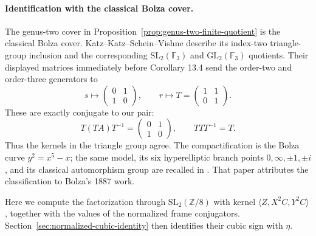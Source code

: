 \paragraph{Identification with the classical Bolza cover.}
The genus-two cover in Proposition~\ref{prop:genus-two-finite-quotient}
is the classical Bolza cover.  Katz--Katz--Schein--Vishne
\cite[\S3 and Corollaries 13.3--13.4]{KKSV2016} describe its
index-two triangle-group inclusion and the corresponding
$\mathrm{SL}_2(\mathbb F_3)$ and $\mathrm{GL}_2(\mathbb F_3)$
quotients.  Their displayed matrices immediately before
Corollary 13.4 send the order-two and order-three generators to
\[
 s\longmapsto\begin{pmatrix}0&1\\1&0\end{pmatrix},\qquad
 r\longmapsto T=\begin{pmatrix}1&1\\0&1\end{pmatrix}.
\]
These are exactly conjugate to our pair:
\[
 T(TA)T^{-1}=\begin{pmatrix}0&1\\1&0\end{pmatrix},\qquad
 TTT^{-1}=T.
\]
Thus the kernels in the triangle group agree.  The compactification is the Bolza
curve $y^2=x^5-x$; the same model, its six hyperelliptic branch
points $0,\infty,\pm1,\pm i$, and its classical automorphism
group are recalled in \cite[\S4, equation (4.1)]{KRRBolza}.
That paper attributes the classification to Bolza's 1887 work.

Here we compute the factorization through
$\mathrm{SL}_2(\mathbb Z/8)$ with kernel
$\langle Z,X^2C,Y^2C\rangle$, together with the values of the
normalized frame conjugators. Section~\ref{sec:normalized-cubic-identity}
then identifies their cubic sign with $\eta$.
